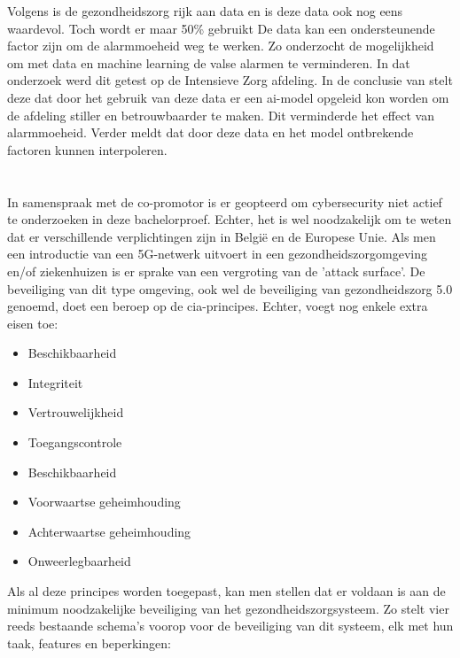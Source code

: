 Volgens \textcite{Niekerk2020} is de gezondheidszorg rijk aan data en is deze data ook nog eens waardevol. Toch wordt er maar 50\% gebruikt 
De data kan een ondersteunende factor zijn om de alarmmoeheid weg te werken. Zo onderzocht \textcite{Hever2019} de mogelijkheid om met data en machine learning de valse alarmen te verminderen. In dat onderzoek werd dit getest op de Intensieve Zorg afdeling. In de conclusie van \textcite{Hever2019} stelt deze dat door het gebruik van deze data er een \gls{ai}-model opgeleid kon worden om de afdeling stiller en betrouwbaarder te maken. Dit verminderde het effect van alarmmoeheid. Verder meldt \textcite{Hever2019} dat door deze data en het model  ontbrekende factoren kunnen interpoleren.

\section{}%
\label{sec:security}%

In samenspraak met de co-promotor is er geopteerd om cybersecurity niet actief te onderzoeken in deze bachelorproef. Echter, het is wel noodzakelijk om te weten dat er verschillende verplichtingen zijn in België en de Europese Unie. Als men een introductie van een 5G-netwerk uitvoert in een gezondheidszorgomgeving en/of ziekenhuizen is er sprake van een vergroting van de 'attack surface'. De beveiliging van dit type omgeving, ook wel de beveiliging van gezondheidszorg 5.0 genoemd, doet een beroep op de \gls{cia}-principes. Echter, \textcite{Wazid2022} voegt nog enkele extra eisen toe:

\begin{itemize}
  \item Beschikbaarheid
  \item Integriteit
  \item Vertrouwelijkheid
  \item Toegangscontrole
  \item Beschikbaarheid
  \item Voorwaartse geheimhouding
  \item Achterwaartse geheimhouding
  \item Onweerlegbaarheid
\end{itemize}

Als al deze principes worden toegepast, kan men stellen dat er voldaan is aan de minimum noodzakelijke beveiliging van het gezondheidszorgsysteem. Zo stelt \textcite{Wazid2022} vier reeds bestaande schema's voorop voor de beveiliging van dit systeem, elk met hun taak, features en beperkingen:

